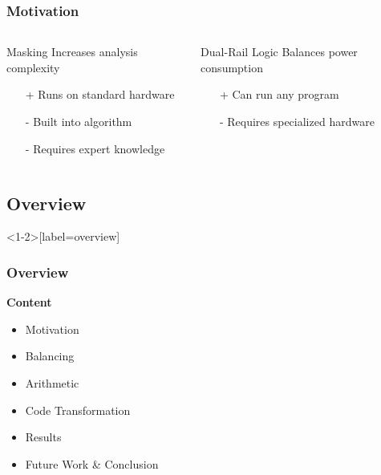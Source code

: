 \documentclass[11pt,t,usepdftitle=false,aspectratio=169]{beamer}
\newcommand{\vq}{\vphantom{q}}
\begin{document}
\begin{frame}
  \frametitle{Motivation}
  \vfill
  \begin{columns}[T]
    \begin{column}{0.48\textwidth}
      \begin{block}{Masking}
        Increases analysis complexity
        \begin{itemize}
        \item[+] Runs on standard hardware
        \item[-] Built into algorithm
        \item[-] Requires expert knowledge
        \end{itemize}
      \end{block}
    \end{column}
    \begin{column}{0.48\textwidth}
      \begin{block}{Dual-Rail Logic}
        Balances power consumption
        \begin{itemize}
        \item[+] Can run any program
        \item[-] Requires specialized hardware
        \item[] \vq
        \end{itemize}
      \end{block}
    \end{column}
  \end{columns}
  \vfill
  \vfill
\end{frame}

\subsection{Overview}

\begin{frame}<1-2>[label=overview]
  \frametitle{Overview}
  \vfill
  \textbf{Content}

  \begin{itemize}
  \item Motivation
  \item \textcolor<2>{uibkorange}{Balancing}
  \item \textcolor<3>{uibkorange}{Arithmetic}
  \item \textcolor<4>{uibkorange}{Code Transformation}
  \item \textcolor<5>{uibkorange}{Results}
  \item \textcolor<6>{uibkorange}{Future Work \& Conclusion}
  \end{itemize}
  \vfill
\end{frame}
\end{document}
